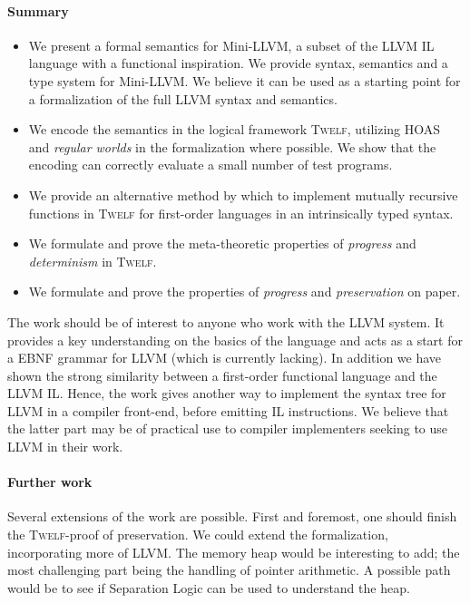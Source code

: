 \documentclass[a4paper, oneside, 10pt, draft]{memoir}
\newcommand{\twelf}{\textsc{Twelf}}
\begin{document}
\paragraph{Summary}
\begin{itemize}
\item We present a formal semantics for Mini-LLVM, a subset of the
  LLVM IL language with a functional inspiration. We provide syntax,
  semantics and a type system for Mini-LLVM. We believe it can be used
  as a starting point for a formalization of the full LLVM syntax and
  semantics.
\item We encode the semantics in the logical framework \twelf{},
  utilizing HOAS and \emph{regular worlds} in the formalization where
  possible. We show that the encoding can correctly evaluate a small
  number of test programs.
\item We provide an alternative method by which to implement mutually
  recursive functions in \twelf{} for first-order languages in an
  intrinsically typed syntax.
\item We formulate and prove the meta-theoretic properties of
  \emph{progress} and \emph{determinism} in \twelf{}.
\item We formulate and prove the properties of \emph{progress} and
  \emph{preservation} on paper.
\end{itemize}

The work should be of interest to anyone who work with the LLVM
system. It provides a key understanding on the basics of the language
and acts as a start for a EBNF grammar for LLVM (which is currently
lacking). In addition we have shown the strong similarity between a
first-order functional language and the LLVM IL. Hence, the work gives
another way to implement the syntax tree for LLVM in a compiler
front-end, before emitting IL instructions. We believe that the latter
part may be of practical use to compiler implementers seeking to use
LLVM in their work.

\paragraph{Further work}

Several extensions of the work are possible. First and foremost, one
should finish the \twelf{}-proof of preservation. We could extend the
formalization, incorporating more of LLVM. The memory heap would be
interesting to add; the most challenging part being the handling of
pointer arithmetic. A possible path would be to see if Separation
Logic\cite{reynolds:2002:separationlogic} can be used to understand
the heap.
\end{document}

